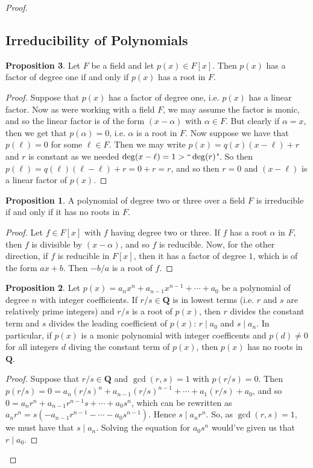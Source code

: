 \documentclass[9pt,reqno]{amsart}
\theoremstyle{definition}
\newtheorem{prop}{Proposition}[section]
\newcommand{\qq}{\mathbf Q}
\begin{document}
\begin{proof}
\subsection{Irreducibility of Polynomials}

\begin{prop}
Let $F$ be a field and let $p(x) \in F[x]$. Then $p(x)$ has a factor of degree one if and only if $p(x)$ has a root in $F$.
\begin{proof}
	Suppose that $p(x)$ has a factor of degree one, i.e. $p(x)$ has a linear factor. Now as were working with a field $F$, we may assume the factor is monic, and so the linear factor is of the form $(x- \alpha )$ with $\alpha \in F$. But clearly if $\alpha = x$, then we get that $p( \alpha ) = 0$, i.e. $\alpha$ is a root in $F$. Now suppose we have that $p (\ell ) = 0$ for some $\ell \in F$. Then we may write $p(x) = q(x)(x-\ell) + r$ and $r$ is constant as we needed $\deg (x - \ell ) = 1 > ``\deg (r)$". So then $p (\ell) = q(\ell) (\ell- \ell) + r = 0 +r = r$, and so then $r = 0 $ and $(x-\ell)$ is a linear factor of $p(x)$. 
\end{proof}	
\begin{prop}A polynomial of degree two or three over a field $F$ is irreducible if and only if it has no roots in $F$.
\end{prop}
\begin{proof}
	Let $f \in F[x]$ with $f$ having degree two or three. If $f$ has a root $\alpha$ in $F$, then $f$ is divisible by $(x-\alpha)$, and so $f$ is reducible. Now, for the other direction, if $f$ is reducible in $F[x]$, then it has a factor of degree $1$, which is of the form $ax+b$. Then $-b/a$ is a root of $f$. 
\end{proof}
\begin{prop}
Let $p(x) = a_n x^n + a_{n-1} x^{n-1} + \cdots + a_0$ be a polynomial of degree $n$ with integer coefficients. If $r/s \in \qq$ is in lowest terms (i.e. $r$ and $s$ are relatively prime integers) and $r/s$ is a root of $p(x)$, then $r$ divides the constant term and $s$ divides the leading coefficient of $p(x)$:  $r \mid a_0$ and $s \mid a_n$. In particular, if $p(x)$ is a monic polynomial with integer coefficents and $p(d) \neq 0$ for all integers $d$ diving the constant term of $p(x)$, then $p(x)$ has no roots in $\qq$. 
\end{prop}
\begin{proof} Suppose that $r/s \in \qq$ and $\gcd (r, s) = 1$ with $p(r/s) = 0$. Then 
	$p(r/s) = 0 = a_n (r/s)^n + a_{n-1} (r/s)^{n-1} + \cdots + a_1 (r/s) + a_0$, and so $ 0 = a_n r^n +a_{n-1} r^{n-1}s  + \cdots + a_0 s^n$, which can be rewritten as $a_n r^n = s(-a_{n-1} r^{n-1}  - \cdots - a_0 s^{n-1})$. Hence $s \mid a_n r^n$. So, as $\gcd (r,s) = 1$, we must have that $s \mid a_n$. Solving the equation for $a_0 s^n$ would've given us that $ r \mid a_0$. 

\end{proof}
\end{prop}
\end{proof}
\end{document}
